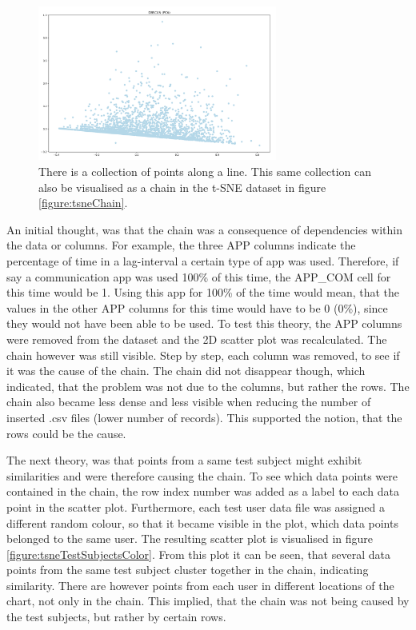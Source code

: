 \begin{figure}[h]
  \centering
  \includegraphics[width=0.7\textwidth]{./images/pcaChain.png}
  \caption{There is a collection of points along a line. This same collection can also be visualised as a chain in the t-SNE dataset in figure \ref{figure:tsneChain}.}
  \label{figure:pcaChain}
\end{figure}


An initial thought, was that the chain was a consequence of dependencies within the data or columns. For example, the three APP columns indicate the percentage of time in a lag-interval a certain type of app was used. Therefore, if say a communication app was used 100\% of this time, the APP\_COM cell for this time would be 1. Using this app for 100\% of the time would mean, that the values in the other APP columns for this time would have to be 0 (0\%), since they would not have been able to be used. To test this theory, the APP columns were removed from the dataset and the 2D scatter plot was recalculated. The chain however was still visible. Step by step, each column was removed, to see if it was the cause of the chain. The chain did not disappear though, which indicated, that the problem was not due to the columns, but rather the rows.  The chain also became less dense and less visible when reducing the number of inserted .csv files (lower number of records). This supported the notion, that the rows could be the cause.

The next theory, was that points from a same test subject might exhibit similarities and were therefore causing the chain. To see which data points were contained in the chain, the row index number was added as a label to each data point in the scatter plot. Furthermore, each test user data file was assigned a different random colour, so that it became visible in the plot, which data points belonged to the same user. The resulting scatter plot is visualised in figure \ref{figure:tsneTestSubjectsColor}. From this plot it can be seen, that several data points from the same test subject cluster together in the chain, indicating similarity. There are however points from each user in different locations of the chart, not only in the chain. This implied, that the chain was not being caused by the test subjects, but rather by certain rows. 


